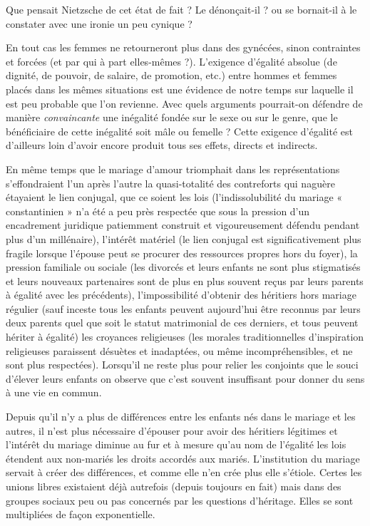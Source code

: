 Que pensait Nietzsche de cet état de fait ? Le dénonçait-il ? ou se bornait-il à le constater avec une ironie un peu cynique ?

En tout cas les femmes ne retourneront plus dans des gynécées, sinon contraintes et forcées (et par qui à part elles-mêmes ?). L'exigence d'égalité absolue (de dignité, de pouvoir, de salaire, de promotion, etc.) entre hommes et femmes placés dans les mêmes situations est une évidence de notre temps sur laquelle il est peu probable que l'on revienne. Avec quels arguments pourrait-on défendre de manière \emph{convaincante} une inégalité fondée sur le sexe ou sur le genre, que le bénéficiaire de cette inégalité soit mâle ou femelle ? Cette exigence d'égalité est d'ailleurs loin d'avoir encore produit tous ses effets, directs et indirects. 


 
 En même temps que le mariage d’amour triomphait dans les représentations s’effondraient l’un après l’autre la quasi-totalité des contreforts qui naguère étayaient le lien conjugal, que ce soient les lois (l'indissolubilité du mariage « constantinien » n’a été a peu près respectée que sous la pression d’un encadrement juridique patiemment construit et vigoureusement défendu pendant plus d'un millénaire), l'intérêt matériel (le lien conjugal est significativement plus fragile lorsque l'épouse peut se procurer des ressources propres hors du foyer), la pression familiale ou sociale (les divorcés et leurs enfants ne sont plus stigmatisés et leurs nouveaux partenaires sont de plus en plus souvent reçus par leurs parents à égalité avec les précédents), l’impossibilité d’obtenir des héritiers hors mariage régulier (sauf inceste tous les enfants peuvent aujourd’hui être reconnus par leurs deux parents quel que soit le statut matrimonial de ces derniers, et tous peuvent hériter à égalité) les croyances religieuses (les morales traditionnelles d'inspiration religieuses  paraissent désuètes et inadaptées, ou même incompréhensibles, et ne sont plus respectées). Lorsqu'il ne reste plus pour relier les conjoints que le souci d’élever leurs enfants on observe que c'est souvent insuffisant pour donner du sens à une vie en commun.

 
 Depuis qu'il n'y a plus de différences entre les enfants nés dans le mariage et les autres, il n'est plus nécessaire d'épouser pour avoir des héritiers légitimes et l'intérêt du mariage diminue au fur et à mesure qu'au nom de l'égalité les lois étendent aux non-mariés les droits accordés aux mariés. L’institution du mariage servait à créer des différences, et comme elle n’en crée plus elle s'étiole.   Certes les unions libres existaient déjà autrefois (depuis toujours en fait) mais dans des groupes sociaux peu ou pas concernés par les questions d’héritage. Elles se sont multipliées de façon exponentielle. 
 
